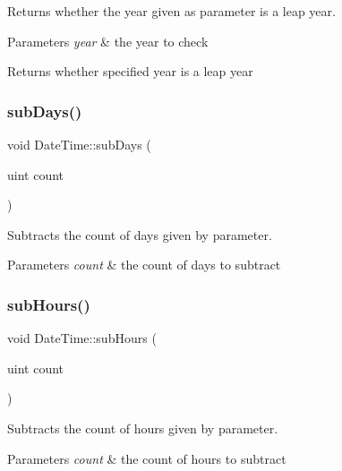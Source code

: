 Returns whether the year given as parameter is a leap year. 


\begin{DoxyParams}{Parameters}
{\em year} & the year to check \\
\hline
\end{DoxyParams}
\begin{DoxyReturn}{Returns}
whether specified year is a leap year 
\end{DoxyReturn}
\mbox{\label{class_date_time_a8b49589808773b2bb330bc5414deae76}} 
\subsubsection{\texorpdfstring{subDays()}{subDays()}}
{\footnotesize\ttfamily void Date\+Time\+::sub\+Days (\begin{DoxyParamCaption}\item[{uint}]{count }\end{DoxyParamCaption})}



Subtracts the count of days given by parameter. 


\begin{DoxyParams}{Parameters}
{\em count} & the count of days to subtract \\
\hline
\end{DoxyParams}
\mbox{\label{class_date_time_ad8731709f4f22cc39dd40b7facdbe058}} 
\subsubsection{\texorpdfstring{subHours()}{subHours()}}
{\footnotesize\ttfamily void Date\+Time\+::sub\+Hours (\begin{DoxyParamCaption}\item[{uint}]{count }\end{DoxyParamCaption})}



Subtracts the count of hours given by parameter. 


\begin{DoxyParams}{Parameters}
{\em count} & the count of hours to subtract \\
\hline
\end{DoxyParams}
\mbox{\label{class_date_time_a5046fae9b637fc3dc994fb5544133585}} 
